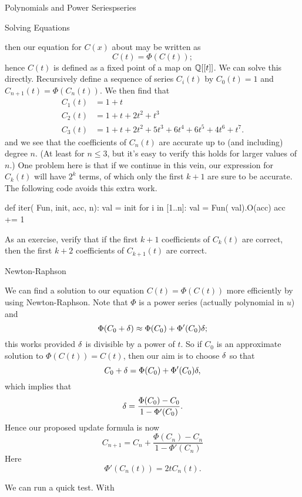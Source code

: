 \begin{chap}{Polynomials and Power Series}{pseries}
\begin{sect}{Solving Equations}
\begin{para}
\[\]
then our equation for $C(x)$ about may be written as
\[
    C(t) = \Phi(C(t));
\]
hence $C(t)$ is defined as a fixed point of a map on ${\mathbb Q}[[t]]$.
We can solve this directly. Recursively define a sequence of series $C_i(t)$ 
by $C_0(t)=1$ and $C_{n+1}(t) =\Phi(C_n(t))$.
We then find that
%
\begin{align*}
    C_1(t) &= 1 + t\\
    C_2(t) &= 1 + t + 2t^2 + t^3\\
    C_3(t) &= 1 + t + 2t^{2} + 5t^{3} + 6t^{4} + 6t^{5} + 4t^{6} + t^{7}.
\end{align*}
%
and we see that the coefficients of $C_n(t)$ are accurate up to 
(and including) degree $n$. (At least for $n\le3$, but it's easy to 
verify this holds for larger values of $n$.) One problem
here is that if we continue in this vein, our expression for $C_k(t)$
will have $2^k$ terms, of which only the first $k+1$ are sure to be accurate.
The following code avoids this extra work.
\end{para}
%
\begin{sagecode}
\begin{sageinput}
def iter( Fun, init, acc, n):
    val = init
    for i in [1..n]:
        val = Fun( val).O(acc)
        acc += 1
\end{sageinput}
\end{sagecode}
%
\begin{para}
As an exercise, verify that if the first $k+1$ coefficients of $C_k(t)$
are correct, then the first $k+2$ coefficients of $C_{k+1}(t)$ are correct.
\end{para}
%
\end{sect}
%
\begin{sect}{Newton-Raphson}
%
\begin{para}
We can find a solution to our equation $C(t) =\Phi(C(t))$ more efficiently by
using Newton-Raphson. Note that $\Phi$ is a power series (actually polynomial in $u$)
and
\[
    \Phi(C_0+\delta) \approx \Phi(C_0) +\Phi'(C_0)\delta;
\]
this works provided $\delta$ is divisible by a power of $t$.
So if $C_0$ is an approximate solution to $\Phi(C(t))=C(t)$, then our aim is to 
choose $\delta$ so that
\[
    C_0 + \delta = \Phi(C_0) +\Phi'(C_0)\delta,
\]
which implies that
\[
    \delta = \frac{\Phi(C_0)-C_0}{1-\Phi'(C_0)}.
\]
Hence our proposed update formula is now
\[
    C_{n+1} = C_n + \frac{\Phi(C_n)-C_n}{1-\Phi'(C_n)}
\]
Here
\[
    \Phi'(C_n(t)) = 2tC_n(t).
\]
\end{para}
%
\begin{para}
We can run a quick test. With

\end{para}
\end{sect}
\end{chap}

